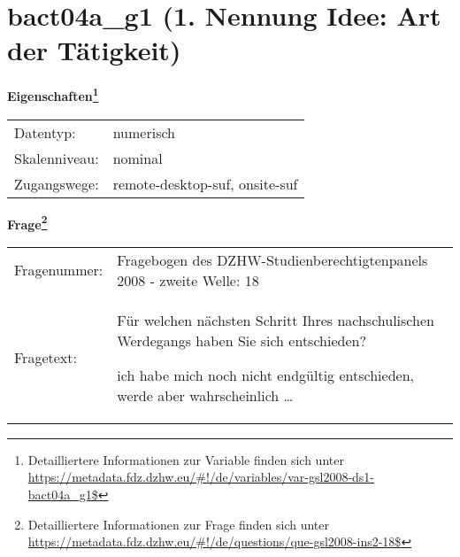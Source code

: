 
    \setcounter{footnote}{0}

    \vspace*{-1.8cm}
	\section{bact04a\_g1 (1. Nennung Idee: Art der Tätigkeit)}
	\label{section:bact04a_g1}



    \vspace*{0.5cm}
    \noindent\textbf{Eigenschaften\footnote{Detailliertere Informationen zur Variable finden sich unter
		\url{https://metadata.fdz.dzhw.eu/\#!/de/variables/var-gsl2008-ds1-bact04a_g1$}}}\\
	\begin{tabularx}{\hsize}{@{}lX}
	Datentyp: & numerisch \\
	Skalenniveau: & nominal \\
	Zugangswege: &
	  remote-desktop-suf, 
	  onsite-suf
 \\
    \end{tabularx}



				\vspace*{0.5cm}
                \noindent\textbf{Frage\footnote{Detailliertere Informationen zur Frage finden sich unter
		              \url{https://metadata.fdz.dzhw.eu/\#!/de/questions/que-gsl2008-ins2-18$}}}\\
				\begin{tabularx}{\hsize}{@{}lX}
					Fragenummer: &
					  Fragebogen des DZHW-Studienberechtigtenpanels 2008 - zweite Welle:
					  18
 \\
					Fragetext: & Für welchen nächsten Schritt Ihres nachschulischen Werdegangs haben Sie sich entschieden?\par  ich habe mich noch nicht endgültig entschieden, werde aber wahrscheinlich … \\
				\end{tabularx}





